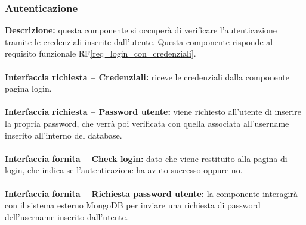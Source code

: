 \subsubsection{Autenticazione}
\textbf{Descrizione:} questa componente si occuperà di verificare l'autenticazione tramite le credenziali inserite dall'utente. Questa componente risponde al requisito funzionale RF\ref{req_login_con_credenziali}. \\
\\
\textbf{Interfaccia richiesta – Credenziali:} riceve le credenziali dalla componente pagina login. \\
\\
\textbf{Interfaccia richiesta – Password utente:} viene richiesto all'utente di inserire la propria password, che verrà poi verificata con quella associata all'username inserito all'interno del database. \\
\\
\textbf{Interfaccia fornita – Check login:} dato che viene restituito alla pagina di login, che indica se l'autenticazione ha avuto successo oppure no. \\
\\
\textbf{Interfaccia fornita – Richiesta password utente:} la componente interagirà con il sistema esterno MongoDB per inviare una richiesta di password dell'username inserito dall'utente. \\
\\


